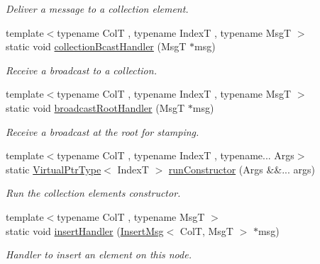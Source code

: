\begin{DoxyCompactItemize}
\begin{DoxyCompactList}\small\item\em Deliver a message to a collection element. \end{DoxyCompactList}\item 
{\footnotesize template$<$typename ColT , typename IndexT , typename MsgT $>$ }\\static void \hyperlink{structvt_1_1vrt_1_1collection_1_1_collection_manager_a2a9fcbafc83d78d80c8d5f758e880b47}{collection\+Bcast\+Handler} (MsgT $\ast$msg)
\begin{DoxyCompactList}\small\item\em Receive a broadcast to a collection. \end{DoxyCompactList}\item 
{\footnotesize template$<$typename ColT , typename IndexT , typename MsgT $>$ }\\static void \hyperlink{structvt_1_1vrt_1_1collection_1_1_collection_manager_a9859d8346c9aac1fb0b65e6db82969db}{broadcast\+Root\+Handler} (MsgT $\ast$msg)
\begin{DoxyCompactList}\small\item\em Receive a broadcast at the root for stamping. \end{DoxyCompactList}\item 
{\footnotesize template$<$typename ColT , typename IndexT , typename... Args$>$ }\\static \hyperlink{structvt_1_1vrt_1_1collection_1_1_collection_manager_a086cab4af6af4f869fbf8814c3a9a6a4}{Virtual\+Ptr\+Type}$<$ IndexT $>$ \hyperlink{structvt_1_1vrt_1_1collection_1_1_collection_manager_ad9a0b889d763dd4eae462b9ca6d07cc9}{run\+Constructor} (Args \&\&... args)
\begin{DoxyCompactList}\small\item\em Run the collection element\textquotesingle{}s constructor. \end{DoxyCompactList}\item 
{\footnotesize template$<$typename ColT , typename MsgT $>$ }\\static void \hyperlink{structvt_1_1vrt_1_1collection_1_1_collection_manager_a1c16b833c74649b4cc0e30d622ddaf61}{insert\+Handler} (\hyperlink{structvt_1_1vrt_1_1collection_1_1_insert_msg}{Insert\+Msg}$<$ ColT, MsgT $>$ $\ast$msg)
\begin{DoxyCompactList}\small\item\em Handler to insert an element on this node. \end{DoxyCompactList}\item 

\end{DoxyCompactItemize}
